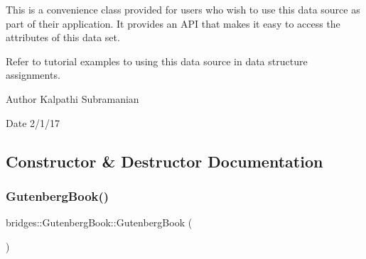 This is a convenience class provided for users who wish to use this data source as part of their application. It provides an A\+PI that makes it easy to access the attributes of this data set.

Refer to tutorial examples to using this data source in data structure assignments.

\begin{DoxyAuthor}{Author}
Kalpathi Subramanian 
\end{DoxyAuthor}
\begin{DoxyDate}{Date}
2/1/17 
\end{DoxyDate}


\subsection{Constructor \& Destructor Documentation}
\mbox{\label{classbridges_1_1_gutenberg_book_a289c167dd11eed17cce39a59931f246c}} 
\subsubsection{\texorpdfstring{Gutenberg\+Book()}{GutenbergBook()}\hspace{0.1cm}{\footnotesize\ttfamily [1/2]}}
{\footnotesize\ttfamily bridges\+::\+Gutenberg\+Book\+::\+Gutenberg\+Book (\begin{DoxyParamCaption}{ }\end{DoxyParamCaption})\hspace{0.3cm}{\ttfamily [inline]}}

\mbox{\label{classbridges_1_1_gutenberg_book_ab792768f0f2567835e90659f163f4438}} 
